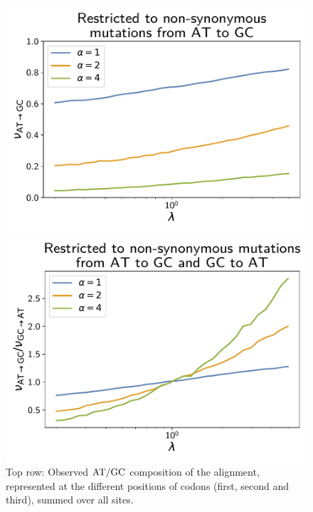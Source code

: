 \documentclass{article}
\begin{document}
\begin{figure}[h]
\begin{minipage}{0.32\linewidth}
        \includegraphics[width=\linewidth, page=1]{simulations/omega_WS}
    \end{minipage}
    \hfill
    \begin{minipage}{0.32\linewidth}
        \includegraphics[width=\linewidth, page=1]{simulations/omega_WS_over_SW}
    \end{minipage}
    \hfill
    \caption[$\atgc$ composition of the alignment]{
        Top row:
        Observed $\atgc$ composition of the alignment, represented at the different positions of codons (first, second and third), summed over all sites.
}
\end{figure}
\end{document}

